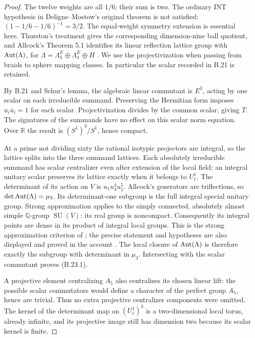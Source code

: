\begin{proof}
The twelve weights are all \(1/6\); their sum is two.
The ordinary INT hypothesis in Deligne--Mostow's original
theorem is not satisfied: \((1-1/6-1/6)^{-1}=3/2\).
The equal-weight symmetry extension is essential here.
Thurston's treatment gives the corresponding dimension-nine
ball quotient, and Allcock's Theorem 5.1 identifies its linear
reflection lattice group with
\(\operatorname{Aut}(\Lambda)\), for
\(\Lambda=\Lambda_4^E\oplus\Lambda_4^E\oplus H\)
\citep{Thurston1998,Allcock2000}. We use the projectivization
when passing from braids to sphere mapping classes. In
particular the scalar recorded in B.21 is retained.

By B.21 and Schur's lemma, the algebraic linear commutant is
\(E^3\), acting by one scalar on each irreducible summand.
Preserving the Hermitian form imposes \(u_i\bar u_i=1\)
for each scalar. Projectivization divides by the common
scalar, giving \(T\). The signatures of the summands have
no effect on this scalar norm equation. Over \(\mathbb R\)
the result is \((S^1)^3/S^1\), hence compact.

At a prime not dividing sixty the rational isotypic
projectors are integral, so the lattice splits into the
three summand lattices. Each absolutely irreducible summand
has scalar centralizer even after extension of the local
field; an integral unitary scalar preserves its lattice
exactly when it belongs to \(U_\ell^1\). The determinant
of its action on \(V\) is \(u_1u_4^4u_5^5\).
Allcock's generators are triflections, so
\(\det\operatorname{Aut}(\Lambda)=\mu_3\). Its determinant-one
subgroup is the full integral special unitary group.
Strong approximation applies to the simply connected,
absolutely almost simple \(\mathbb Q\)-group
\(\operatorname{SU}(V)\): its real group is noncompact.
Consequently its integral points are dense in its product
of integral local groups. This is the strong approximation
criterion of \citet[Theorem 7.12]{PlatonovRapinchuk1994};
the precise statement and hypotheses are also displayed
and proved in the account
\citet[Theorem 2.3, Section 2.6]{Rapinchuk2012}.
The local closure of \(\operatorname{Aut}(\Lambda)\) is therefore exactly
the subgroup with determinant in \(\mu_3\). Intersecting
with the scalar commutant proves (B.23.1).

A projective element centralizing \(A_5\) also centralizes
its chosen linear lift: the possible scalar commutators
would define a character of the perfect group \(A_5\),
hence are trivial. Thus no extra projective centralizer
components were omitted. The kernel of the determinant
map on \((U_\ell^1)^3\) is a two-dimensional local torus,
already infinite, and its projective image still has
dimension two because its scalar kernel is finite.
\end{proof}

